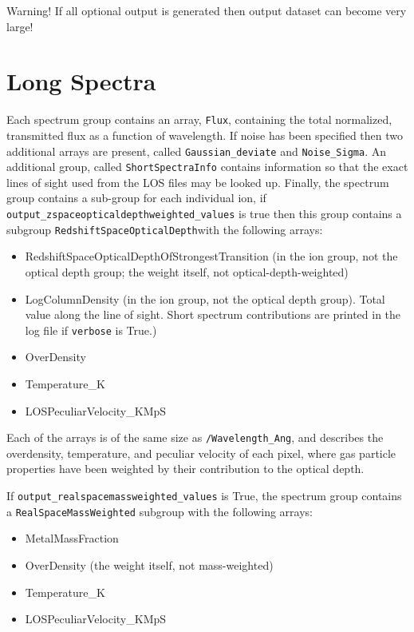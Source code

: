 \documentclass{report}
\newcommand{\param}[1]{{\tt #1}}
\begin{document}
Warning!  If all optional output is generated then output dataset can become very large!

\section{Long Spectra}

Each spectrum group contains an array, {\tt Flux}, containing the total normalized, transmitted flux as a function of wavelength.  If noise has been specified then two additional arrays are present, called {\tt Gaussian\_deviate} and {\tt Noise\_Sigma}.  An additional group, called {\tt ShortSpectraInfo} contains information so that the exact lines of sight used from the LOS files may be looked up.  Finally, the spectrum group contains a sub-group for each individual ion, if {\tt output\_zspaceopticaldepthweighted\_values} is true then this group contains a subgroup {\tt RedshiftSpaceOpticalDepth}with the following arrays:

\begin{itemize}
\item RedshiftSpaceOpticalDepthOfStrongestTransition (in the ion group, not the optical depth group; the weight itself, not optical-depth-weighted)
\item LogColumnDensity (in the ion group, not the optical depth group). Total value along the line of sight. Short spectrum contributions are printed in the log file if \param{verbose} is True.)
\item OverDensity
\item Temperature\_K
\item LOSPeculiarVelocity\_KMpS
\end{itemize}

Each of the arrays is of the same size as {\tt /Wavelength\_Ang}, and describes the overdensity, temperature, and peculiar velocity of each pixel, where gas particle properties have been weighted by their contribution to the optical depth.

If \param{output\_realspacemassweighted\_values} is True, the spectrum group contains a \param{RealSpaceMassWeighted} subgroup with the following arrays:
\begin{itemize}
\item MetalMassFraction 
\item OverDensity (the weight itself, not mass-weighted)
\item Temperature\_K
\item LOSPeculiarVelocity\_KMpS
\end{itemize}
\end{document}
